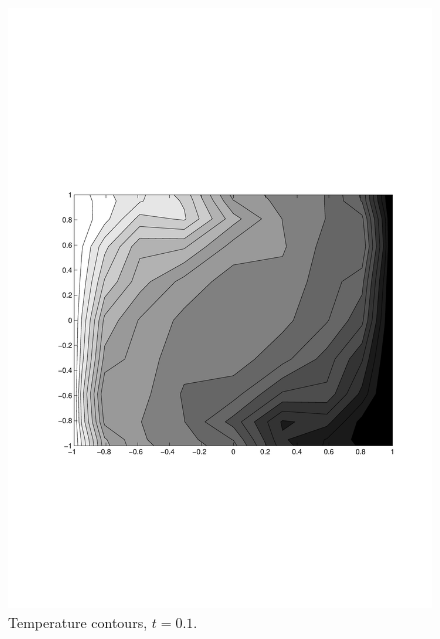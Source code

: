 \begin{multicols}{2}
\begin{figure}[H]
\centering
\includegraphics[scale=0.45, trim = 30mm 75mm 15mm 80mm,
clip]{./Figures/4-IVBP/temperature_t_1.pdf} \caption{Temperature contours, $t=0.1$.}
\end{figure}

\end{multicols}

